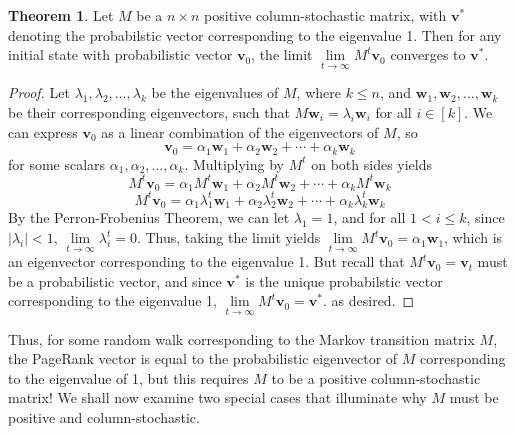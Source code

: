 \documentclass[11pt]{article}
\theoremstyle{definition}
\newtheorem{theorem}{Theorem}
\newcommand{\abs}[1]{\left| #1\right|}
\renewcommand{\vec}[1]{\mathbf{#1}}
\begin{document}

\begin{theorem}
    Let $M$ be a $n\times n$ positive column-stochastic matrix, with $\vec{v}^*$ denoting the probabilstic vector corresponding to the eigenvalue 1.
    Then for any initial state with probabilistic vector $\vec{v}_0$, the limit $\lim\limits_{t\to \infty}{M^t \vec{v}_0}$ converges to $\vec{v}^*$.    
\end{theorem}
\begin{proof}
    Let $\lambda_1, \lambda_2, \ldots, \lambda_k$ be the eigenvalues of $M$, where $k \leq n$, and $\vec{w}_1, \vec{w}_2, \ldots, \vec{w}_k$ be their corresponding eigenvectors, 
    such that $M \vec{w}_i = \lambda_i \vec{w}_i$ for all $i \in [k]$.
    We can express $\vec{v}_0$ as a linear combination of the eigenvectors of $M$, so
    $$\vec{v}_0 = \alpha_1 \vec{w}_1 + \alpha_2 \vec{w}_2 + \cdots + \alpha_k \vec{w}_k$$
    for some scalars $\alpha_1, \alpha_2, \ldots, \alpha_k$. Multiplying by $M^t$ on both sides yields
    $$M^t \vec{v}_0 = \alpha_1 M^t \vec{w}_1 + \alpha_2 M^t \vec{w}_2 + \cdots + \alpha_k M^t \vec{w}_k$$
    $$M^t \vec{v}_0 = \alpha_1 \lambda_1^t \vec{w}_1 + \alpha_2 \lambda_2^t \vec{w}_2 + \cdots + \alpha_k \lambda_k^t \vec{w}_k$$
    By the Perron-Frobenius Theorem, we can let $\lambda_1 = 1$,
    and for all $1 < i \leq k$, since $\abs{\lambda_i} < 1$, $\lim\limits_{t\to \infty}{\lambda_i^t} = 0$.
    Thus, taking the limit yields $\lim\limits_{t\to \infty}{M^t \vec{v}_0} = \alpha_1 \vec{w}_1$, which is an eigenvector corresponding to the eigenvalue 1.
    But recall that $M^t \vec{v}_0 = \vec{v}_t$ must be a probabilistic vector,
    and since $\vec{v}^*$ is the unique probabilstic vector corresponding to the eigenvalue 1, $\lim\limits_{t\to \infty}{M^t \vec{v}_0} = \vec{v}^*$. as desired.
\end{proof}

Thus, for some random walk corresponding to the Markov transition matrix $M$, 
the PageRank vector is equal to the probabilistic eigenvector of $M$ corresponding to the eigenvalue of 1, but this requires $M$ to be a positive column-stochastic matrix!
We shall now examine two special cases that illuminate why $M$ must be positive and column-stochastic.
\end{document}
